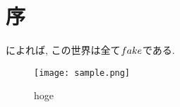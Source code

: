 \documentclass[Main]{subfiles}
\begin{document}
\section{序}

\cite{non-non}によれば, この世界は全て$fake$である.

\begin{figure}[htbp]
    \begin{center}
        \texttt{[image: sample.png]}
        \caption{hoge}
    \end{center}
\end{figure}
\end{document}
